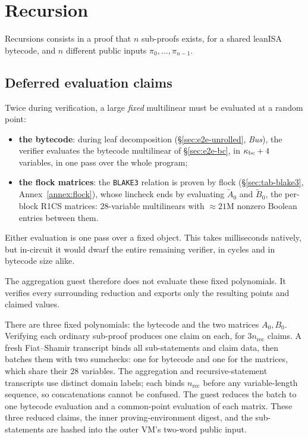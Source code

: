 \section{Recursion}\label{sec:recursion}

Recursions consists in a proof that $n$ sub-proofs exists, for a shared leanISA bytecode, and $n$ different public inputs $\pi_0, \ldots, \pi_{n-1}$.

\subsection{Deferred evaluation claims}\label{sec:deferred-claims}

Twice during verification, a large \emph{fixed} multilinear must be evaluated at a random point:
\begin{itemize}
\item \textbf{the bytecode}: during leaf decomposition (\S\ref{sec:e2e-unrolled}, \emph{Bus}), the verifier evaluates the bytecode multilinear of \S\ref{sec:e2e-bc}, in $\kappa_{\mathrm{bc}}+4$ variables, in one pass over the whole program;
\item \textbf{the flock matrices}: the \texttt{BLAKE3} relation is proven by flock (\S\ref{sec:tab-blake3}, Annex~\ref{annex:flock}), whose lincheck ends by evaluating $\widetilde A_0$ and $\widetilde B_0$, the per-block R1CS matrices: $28$-variable multilinears with $\approx 21\mathrm{M}$ nonzero Boolean entries between them.
\end{itemize}
Either evaluation is one pass over a fixed object. This takes milliseconds natively, but in-circuit it would dwarf the entire remaining verifier, in cycles and in bytecode size alike.

The aggregation guest therefore does not evaluate these fixed polynomials. It verifies every surrounding reduction and exports only the resulting points and claimed values.

There are three fixed polynomials: the bytecode and the two matrices $A_0,B_0$. Verifying each ordinary sub-proof produces one claim on each, for $3n_{\mathrm{rec}}$ claims. A fresh Fiat--Shamir transcript binds all sub-statements and claim data, then batches them with two sumchecks: one for bytecode and one for the matrices, which share their $28$ variables. The aggregation and recursive-statement transcripts use distinct domain labels; each binds $n_{\mathrm{rec}}$ before any variable-length sequence, so concatenations cannot be confused. The guest reduces the batch to one bytecode evaluation and a common-point evaluation of each matrix. These three reduced claims, the inner proving-environment digest, and the sub-statements are hashed into the outer VM's two-word public input.


